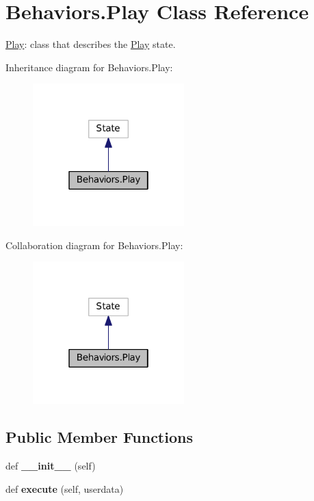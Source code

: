 \hypertarget{classBehaviors_1_1Play}{}\section{Behaviors.\+Play Class Reference}
\label{classBehaviors_1_1Play}


\hyperlink{classBehaviors_1_1Play}{Play}\+: class that describes the \hyperlink{classBehaviors_1_1Play}{Play} state.  




Inheritance diagram for Behaviors.\+Play\+:\nopagebreak
\begin{figure}[H]
\begin{center}
\leavevmode
\includegraphics[width=166pt]{classBehaviors_1_1Play__inherit__graph}
\end{center}
\end{figure}


Collaboration diagram for Behaviors.\+Play\+:\nopagebreak
\begin{figure}[H]
\begin{center}
\leavevmode
\includegraphics[width=166pt]{classBehaviors_1_1Play__coll__graph}
\end{center}
\end{figure}
\subsection*{Public Member Functions}
\begin{DoxyCompactItemize}
\item 
def {\bfseries \+\_\+\+\_\+init\+\_\+\+\_\+} (self)\hypertarget{classBehaviors_1_1Play_a5a5684ee3c87670a8eeeadb57ecba0d3}{}\label{classBehaviors_1_1Play_a5a5684ee3c87670a8eeeadb57ecba0d3}

\item 
def {\bfseries execute} (self, userdata)\hypertarget{classBehaviors_1_1Play_a2c8c1be112cceeb3b11c2450755306fe}{}\label{classBehaviors_1_1Play_a2c8c1be112cceeb3b11c2450755306fe}

\end{DoxyCompactItemize}


